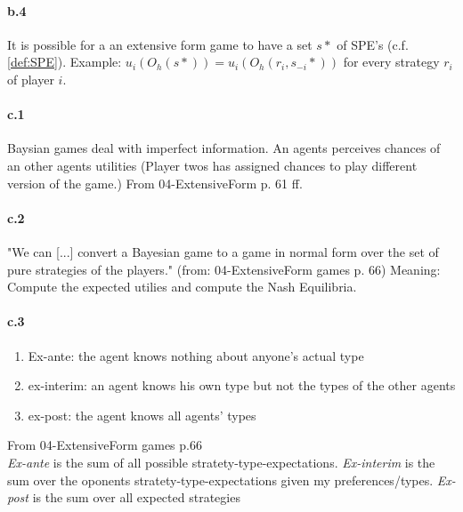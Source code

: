 \paragraph{b.4}
It is possible for a an extensive form game to have a set $s*$ of SPE's  (c.f. \ref{def:SPE}).
Example: $u_i(O_h(s*)) = u_i(O_h(r_i,s_{-i}*))$ for every strategy $r_i$ of player $i$.


\paragraph{c.1}
\label{Problem_definition_baysian_games}
Baysian games deal with imperfect information.
An agents perceives chances of an other agents utilities (Player twos has assigned chances to play different version of the game.)
From 04-ExtensiveForm p. 61 ff.

\paragraph{c.2}
\label{baysian_to_normal_games_conversion}
"We can [...] convert a Bayesian game to a game in normal form over the set of pure strategies of the players."
(from: 04-ExtensiveForm games p. 66)
Meaning: Compute the expected utilies and compute the Nash Equilibria.

\paragraph{c.3}
\label{Expected_utilities}
\begin{enumerate}
	\item {Ex-ante:} the agent knows nothing about anyone's actual type
	\item {ex-interim:} an agent knows his own type but not the types of the other agents
	\item {ex-post:} the agent knows all agents' types
\end{enumerate}
From 04-ExtensiveForm games p.66
\\
\textit{Ex-ante} is the sum of all possible stratety-type-expectations. 
\textit{Ex-interim} is the sum over the oponents stratety-type-expectations given my preferences/types.
\textit{Ex-post} is the sum over all expected strategies
